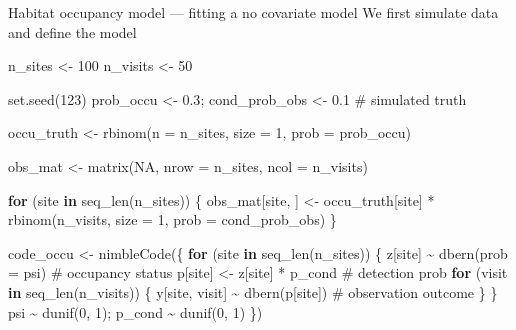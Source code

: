 \documentclass[
  10pt,
  ignorenonframetext,
  aspectratio=169,
  t]{beamer}
\newenvironment{Shaded}{\begin{snugshade}}{\end{snugshade}}
\newcommand{\AttributeTok}[1]{\textcolor[rgb]{0.40,0.45,0.13}{#1}}
\newcommand{\CommentTok}[1]{\textcolor[rgb]{0.37,0.37,0.37}{#1}}
\newcommand{\ConstantTok}[1]{\textcolor[rgb]{0.56,0.35,0.01}{#1}}
\newcommand{\ControlFlowTok}[1]{\textcolor[rgb]{0.00,0.23,0.31}{\textbf{#1}}}
\newcommand{\DecValTok}[1]{\textcolor[rgb]{0.68,0.00,0.00}{#1}}
\newcommand{\FloatTok}[1]{\textcolor[rgb]{0.68,0.00,0.00}{#1}}
\newcommand{\FunctionTok}[1]{\textcolor[rgb]{0.28,0.35,0.67}{#1}}
\newcommand{\NormalTok}[1]{\textcolor[rgb]{0.00,0.23,0.31}{#1}}
\newcommand{\OtherTok}[1]{\textcolor[rgb]{0.00,0.23,0.31}{#1}}
\newcommand{\SpecialCharTok}[1]{\textcolor[rgb]{0.37,0.37,0.37}{#1}}
\begin{document}
\begin{frame}[fragile]{Habitat occupancy model --- fitting a no
covariate model}
\protect{}\label{habitat-occupancy-model-fitting-a-no-covariate-model}
We first simulate data and define the model

\scriptsize

\begin{Shaded}
\begin{Highlighting}[]
\NormalTok{n\_sites }\OtherTok{\textless{}{-}} \DecValTok{100}
\NormalTok{n\_visits }\OtherTok{\textless{}{-}} \DecValTok{50}

\FunctionTok{set.seed}\NormalTok{(}\DecValTok{123}\NormalTok{)}
\NormalTok{prob\_occu }\OtherTok{\textless{}{-}} \FloatTok{0.3}\NormalTok{; cond\_prob\_obs }\OtherTok{\textless{}{-}} \FloatTok{0.1}  \CommentTok{\# simulated truth}

\NormalTok{occu\_truth }\OtherTok{\textless{}{-}} \FunctionTok{rbinom}\NormalTok{(}\AttributeTok{n =}\NormalTok{ n\_sites, }\AttributeTok{size =} \DecValTok{1}\NormalTok{, }\AttributeTok{prob =}\NormalTok{ prob\_occu)}

\NormalTok{obs\_mat }\OtherTok{\textless{}{-}} \FunctionTok{matrix}\NormalTok{(}\ConstantTok{NA}\NormalTok{, }\AttributeTok{nrow =}\NormalTok{ n\_sites, }\AttributeTok{ncol =}\NormalTok{ n\_visits)}

\ControlFlowTok{for}\NormalTok{ (site }\ControlFlowTok{in} \FunctionTok{seq\_len}\NormalTok{(n\_sites)) \{}
\NormalTok{  obs\_mat[site, ] }\OtherTok{\textless{}{-}}\NormalTok{ occu\_truth[site] }\SpecialCharTok{*} \FunctionTok{rbinom}\NormalTok{(n\_visits, }\AttributeTok{size =} \DecValTok{1}\NormalTok{, }\AttributeTok{prob =}\NormalTok{ cond\_prob\_obs)}
\NormalTok{\}}

\NormalTok{code\_occu }\OtherTok{\textless{}{-}} \FunctionTok{nimbleCode}\NormalTok{(\{}
  \ControlFlowTok{for}\NormalTok{ (site }\ControlFlowTok{in} \FunctionTok{seq\_len}\NormalTok{(n\_sites)) \{}
\NormalTok{    z[site] }\SpecialCharTok{\textasciitilde{}} \FunctionTok{dbern}\NormalTok{(}\AttributeTok{prob =}\NormalTok{ psi) }\CommentTok{\# occupancy status}
\NormalTok{    p[site] }\OtherTok{\textless{}{-}}\NormalTok{ z[site] }\SpecialCharTok{*}\NormalTok{ p\_cond  }\CommentTok{\# detection prob}
    \ControlFlowTok{for}\NormalTok{ (visit }\ControlFlowTok{in} \FunctionTok{seq\_len}\NormalTok{(n\_visits)) \{}
\NormalTok{      y[site, visit] }\SpecialCharTok{\textasciitilde{}} \FunctionTok{dbern}\NormalTok{(p[site]) }\CommentTok{\# observation outcome}
\NormalTok{    \}}
\NormalTok{  \}}
\NormalTok{  psi }\SpecialCharTok{\textasciitilde{}} \FunctionTok{dunif}\NormalTok{(}\DecValTok{0}\NormalTok{, }\DecValTok{1}\NormalTok{); p\_cond }\SpecialCharTok{\textasciitilde{}} \FunctionTok{dunif}\NormalTok{(}\DecValTok{0}\NormalTok{, }\DecValTok{1}\NormalTok{)}
\NormalTok{\})}
\end{Highlighting}
\end{Shaded}

\normalsize
\end{frame}
\end{document}
